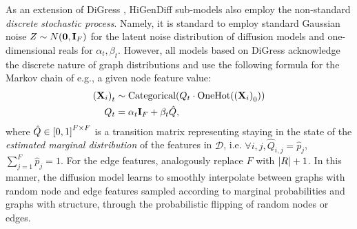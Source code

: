 As an extension of DiGress \cite{vignac_digress_2022}, HiGenDiff sub-models also employ the non-standard \emph{discrete stochastic process}. Namely, it is standard to employ standard Gaussian noise $Z\sim N\mathopen{}\left(\mathbf{0},\mathbf{I}_F\right)$ for the latent noise distribution of diffusion models and one-dimensional reals for $\alpha_t,\beta_t$. However, all models based on DiGress acknowledge the discrete nature of graph distributions and use the following formula for the Markov chain of e.g., a given node feature value:
\begin{align}
\begin{split}
    \mathopen{}\left(\mathbf{X}_i\right)_t &\sim \text{Categorical}\mathopen{}\left(Q_t \cdot \text{OneHot}\mathopen{}\left(\mathopen{}\left(\mathbf{X}_i\right)_0\right)\right) \\
    Q_t &= \alpha_t \mathbf{I}_F + \beta_t \hat{Q},
\end{split}
\end{align}
where $\hat{Q} \in \mathopen{}\left[0,1\right]^{F \times F}$ is a transition matrix representing staying in the state of the \emph{estimated marginal distribution} of the features in $\mathcal{D}$, i.e. $\forall i,j,\hat{Q}_{i,j} = \hat{p}_j$, $\sum_{j=1}^{F}{\hat{p}_j}=1$. For the edge features, analogously replace $F$ with $\mathopen{}\left|R\right|+1$. In this manner, the diffusion model learns to smoothly interpolate between graphs with random node and edge features sampled according to marginal probabilities and graphs with structure, through the probabilistic flipping of random nodes or edges.

